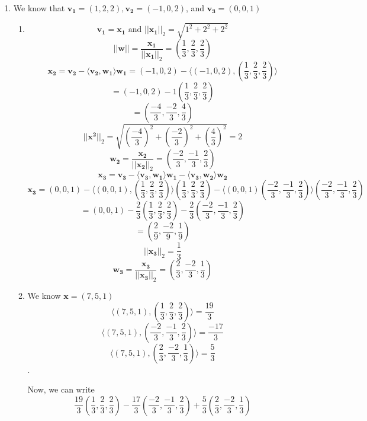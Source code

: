 \documentclass[12pt]{article}
\begin{document}
\begin{enumerate}[leftmargin=0em]
  \item
  We know that $\mathbf{v_1} = (1, 2, 2), \mathbf{v_2} = (-1, 0, 2)$, and $\mathbf{v_3} = (0,0,1)$

  \begin{enumerate}[leftmargin=!]
    \item
    \[ \mathbf{v_1} = \mathbf{x_1} \text{ and } ||\mathbf{x_1}||_{2} = \sqrt{1^2+2^2+2^2}\]
    \[ ||\mathbf{w}|| = \frac{\mathbf{x_1}}{||\mathbf{x_1}||_2} = (\frac{1}{3}, \frac{2}{3}, \frac{2}{3}) \]
    \[ \mathbf{x_2} = \mathbf{v_2} - \langle \mathbf{v_2}, \mathbf{w_1} \rangle \mathbf{w_1} = (-1, 0, 2) - \langle (-1, 0, 2) , (\frac{1}{3}, \frac{2}{3}, \frac{2}{3}) \rangle\]
    \[ = (-1, 0, 2) - 1(\frac{1}{3}, \frac{2}{3}, \frac{2}{3})\]
    \[ = (\frac{-4}{3}, \frac{-2}{3}, \frac{4}{3})\]   
    \[||\mathbf{x^2}||_2 = \sqrt{(\frac{-4}{3})^{2} + (\frac{-2}{3})^{2} + (\frac{4}{3})^{2}} = 2\] 
    \[ \mathbf{w_2} = \frac{\mathbf{x_2}}{||\mathbf{x_2}||_2} = (\frac{-2}{3}, \frac{-1}{3}, \frac{2}{3})\]
    \[ \mathbf{x_3} = \mathbf{v_3} - \langle \mathbf{v_3}, \mathbf{w_1} \rangle \mathbf{w_1} - \langle \mathbf{v_3}, \mathbf{w_2} \rangle \mathbf{w_2}\]
    \[ \mathbf{x_3} = (0, 0, 1) - \langle (0, 0, 1), (\frac{1}{3}, \frac{2}{3}, \frac{2}{3})\rangle (\frac{1}{3}, \frac{2}{3}, \frac{2}{3}) - \langle (0,0,1) (\frac{-2}{3}, \frac{-1}{3}, \frac{2}{3}) \rangle (\frac{-2}{3}, \frac{-1}{3}, \frac{2}{3})\]
    \[ = (0,0,1) - \frac{2}{3}(\frac{1}{3}, \frac{2}{3}, \frac{2}{3}) - \frac{2}{3}(\frac{-2}{3}, \frac{-1}{3}, \frac{2}{3})\]
    \[ = (\frac{2}{9}, \frac{-2}{9}, \frac{1}{9})\]
    \[ || \mathbf{x_3} ||_2 = \frac{1}{3} \]
    \[ \mathbf{w_3} = \frac{\mathbf{x_3}}{||\mathbf{x_3}||_2} = (\frac{2}{3}, \frac{-2}{3}, \frac{1}{3})\]

    \item
    We know $\mathbf{x} = (7, 5, 1)$
    \[ \langle (7, 5, 1), (\frac{1}{3}, \frac{2}{3}, \frac{2}{3}) \rangle = \frac{19}{3}\]
    \[ \langle (7, 5, 1), (\frac{-2}{3}, \frac{-1}{3}, \frac{2}{3}) \rangle = \frac{-17}{3}\]
    \[ \langle (7, 5, 1), (\frac{2}{3}, \frac{-2}{3}, \frac{1}{3}) \rangle = \frac{5}{3}\].

    Now, we can write 
    \[ \frac{19}{3}(\frac{1}{3}, \frac{2}{3}, \frac{2}{3}) - \frac{17}{3}(\frac{-2}{3}, \frac{-1}{3}, \frac{2}{3}) + \frac{5}{3}(\frac{2}{3}, \frac{-2}{3}, \frac{1}{3})\]
  \end{enumerate}
\end{enumerate}
\end{document}
